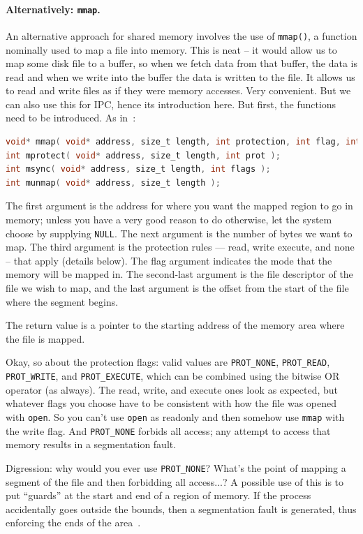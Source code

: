 \documentclass[a4paper]{report}
\begin{document}
\paragraph{Alternatively: \texttt{mmap}.} An alternative approach for shared memory involves the use of \texttt{mmap()}, a function nominally used to map a file into memory. This is neat -- it would allow us to map some disk file to a buffer, so when we fetch data from that buffer, the data is read and when we write into the buffer the data is written to the file. It allows us to read and write files as if they were memory accesses. Very convenient. But we can also use this for IPC, hence its introduction here. But first, the functions need to be introduced. As in~\cite{apunix}:

\begin{lstlisting}[language=C]
void* mmap( void* address, size_t length, int protection, int flag, int fd, off_t offset );
int mprotect( void* address, size_t length, int prot );
int msync( void* address, size_t length, int flags );
int munmap( void* address, size_t length );
\end{lstlisting}

The first argument is the address for where you want the mapped region to go in memory; unless you have a very good reason to do otherwise, let the system choose by supplying \texttt{NULL}. The next argument is the number of bytes we want to map. The third argument is the protection rules --- read, write execute, and none -- that apply (details below). The flag argument indicates the mode that the memory will be mapped in. The second-last argument is the file descriptor of the file we wish to map, and the last argument is the offset from the start of the file where the segment begins.

The return value is a pointer to the starting address of the memory area where the file is mapped.

Okay, so about the protection flags: valid values are \texttt{PROT\_NONE}, \texttt{PROT\_READ}, \texttt{PROT\_WRITE}, and \texttt{PROT\_EXECUTE}, which can be combined using the bitwise OR operator (as always). The read, write, and execute ones look as expected, but whatever flags you choose have to be consistent with how the file was opened with \texttt{open}. So you can't use \texttt{open} as readonly and then somehow use \texttt{mmap} with the write flag. And \texttt{PROT\_NONE} forbids all access; any attempt to access that memory results in a segmentation fault.

Digression: why would you ever use \texttt{PROT\_NONE}? What's the point of mapping a segment of the file and then forbidding all access...?  A possible use of this is to put ``guards'' at the start and end of a region of memory. If the process accidentally goes outside the bounds, then a segmentation fault is generated, thus enforcing the ends of the area~\cite{lpi}.
\end{document}
